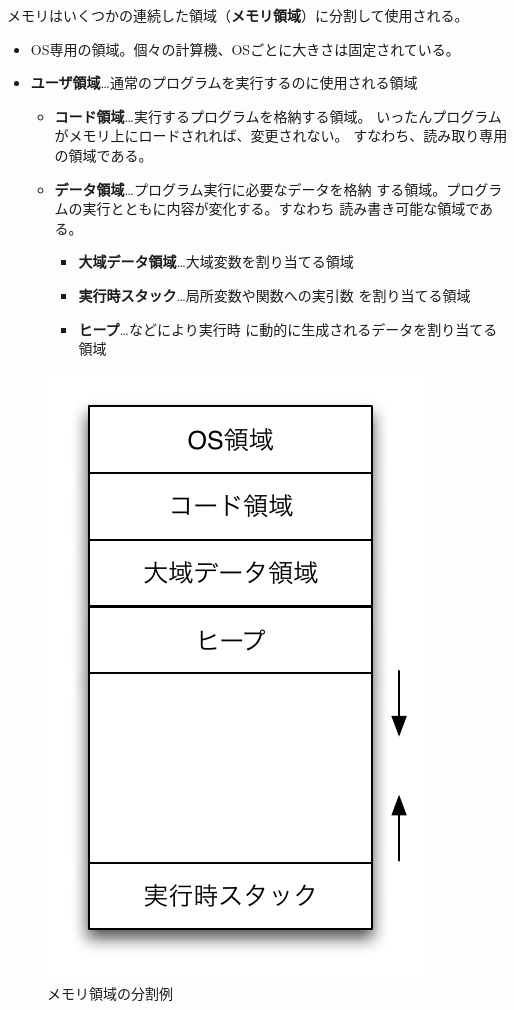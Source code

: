 メモリはいくつかの連続した領域（{\bf メモリ領域}）に分割して使用される。
\begin{itemize}
 \item OS専用の領域。個々の計算機、OSごとに大きさは固定されている。
 \item {\bfseries ユーザ領域}…通常のプログラムを実行するのに使用される領域
       \begin{itemize}
	\item {\bfseries コード領域}…実行するプログラムを格納する領域。
	      いったんプログラムがメモリ上にロードされれば、変更されない。
	      すなわち、読み取り専用の領域である。
	\item {\bfseries データ領域}…プログラム実行に必要なデータを格納
	      する領域。プログラムの実行とともに内容が変化する。すなわち
	      読み書き可能な領域である。
	      \begin{itemize}
	       \item {\bfseries 大域データ領域}…大域変数を割り当てる領域
	       \item {\bfseries 実行時スタック}…局所変数や関数への実引数
		     を割り当てる領域
	       \item {\bfseries ヒープ}…などにより実行時
		     に動的に生成されるデータを割り当てる領域
	      \end{itemize}
       \end{itemize}
\end{itemize}

\begin{figure}
 \begin{center}
  \includegraphics{figure/memory_area.pdf}
 \end{center}
 \caption{メモリ領域の分割例}
 \label{104220_11Apr06}
\end{figure}

